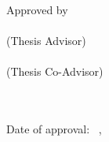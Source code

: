 \clearpage
\thispagestyle{empty}

\begin{center}
    \MakeUppercase{\textbf{\thesistitle}} \\
\end{center}


\vfill
{Approved by} \\
[3\baselineskip]

\advisor \dotfill \\
(Thesis Advisor) \\[\baselineskip]

\coadvisor \dotfill \\
(Thesis Co-Advisor) \\[\baselineskip]

\domjurya \dotfill \\[2\baselineskip]
\domjuryb \dotfill \\[2\baselineskip]

\vfill

Date of approval:  \month~\day,~\year

\clearpage